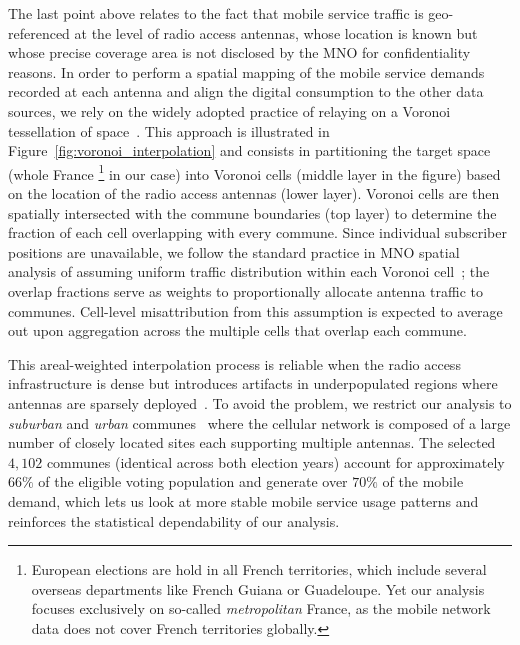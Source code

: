 \documentclass[9pt,sigconf,letterpaper]{acmart}
\begin{document}
The last point above relates to the fact that mobile service traffic is geo-referenced at the level of radio access antennas, whose location is known but whose precise coverage area is not disclosed by the \ac{MNO} for confidentiality reasons.
In order to perform a spatial mapping of the mobile service demands recorded at each antenna and align the digital consumption to the other data sources, we rely on the widely adopted practice of relaying on a Voronoi tessellation of space~\cite{voronoi, voronoiboost_secon, 5g_infocom, ucar21news}. This approach is illustrated in Figure~\ref{fig:voronoi_interpolation} and consists in partitioning the target space (whole France%
\footnote{European elections are hold in all French territories, which include several overseas departments like French Guiana or Guadeloupe. Yet our analysis focuses exclusively on so-called \textit{metropolitan} France, as the mobile network data does not cover French territories globally.}
in our case) into Voronoi cells (middle layer in the figure) based on the location of the radio access antennas (lower layer).
Voronoi cells are then spatially intersected with the commune boundaries (top layer) to determine the fraction of each cell overlapping with every commune. Since individual subscriber positions are unavailable, we follow the standard practice in \ac{MNO} spatial analysis of assuming uniform traffic distribution within each Voronoi cell~\cite{ricciato2021estimation,batista2020uncovering,www_20_cellrep,martinez2024deepmend,goel2025predicting}; the overlap fractions serve as weights to proportionally allocate antenna traffic to communes. Cell-level misattribution from this assumption is expected to average out upon aggregation across the multiple cells that overlap each commune.

This areal-weighted interpolation process is reliable when the radio access infrastructure is dense but introduces artifacts in underpopulated regions where antennas are sparsely deployed~\cite{mishra2022digitaldivide}. To avoid the problem, we restrict our analysis to \textit{suburban} and \textit{urban} communes~\cite{commune_urban} where the cellular network is composed of a large number of closely located sites each supporting multiple antennas.
The selected $4{,}102$ communes (identical across both election years) account for approximately $66\%$ of the eligible voting population and
generate over $70\%$ of the mobile demand, which lets us look at more stable mobile service usage patterns and reinforces the statistical dependability of our analysis.
    
\end{document}
